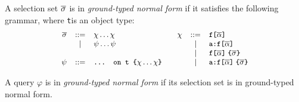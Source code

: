 \begin{definition}
A \gql selection set $\overline{\sigma}$ is in \textit{ground-typed normal form} if it satisfies the following grammar, where \texttt{t}is an object type: %
\begin{displaymath}\small
	\begin{array}{rcl@{\qquad}rcl}
	\sset & ::= & \chi \ldots \chi & \chi & ::= & \fld \\
	& | & \psi \ldots \psi & & | & \afld\\
	& & & & | & \nfld{\sset}\\
	\psi & ::= & \ifrag{t}{\chi \ldots \chi} & & | & \anfld{\sset}	
	\end{array}
\end{displaymath}
	
	\end{definition}
\iffalse
\begin{itemize}
	\item If it is a field then its subselections are either all fields or all inline fragments
	\item If it is an inline fragment, then its type condition is an object type and its subselections are only fields, and
	\item Its subselections are in ground-typed normal form.
\end{itemize}
\end{definition}
\fi

\begin{definition}
A \gql query $\varphi$ is in \textit{ground-typed normal form} if its selection set is in ground-typed normal form.
\end{definition}

\iffalse
We formalize the latter with the following definition in Coq.
\begin{verbatim}
Definition is_a_grounded_typed_nf_query 
  (s : wfGraphQLSchema) (|$\query$| : query) :=
    are_in_ground_typed_nf s |$\query$|.(selection_set).
  \end{verbatim}
  \fi 

